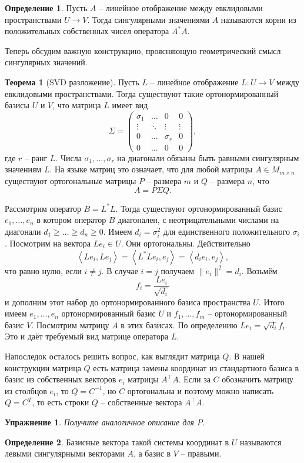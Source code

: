 \documentclass[12pt,a4paper,oneside]{book}
\newtheorem{uprz}{\color{violet!100!black} Упражнение}
\theoremstyle{definition}
\newtheorem*{defn}{\color{yellow!30!red} Определение}
\newtheorem{thm}{\color{red!40!black}Теорема}
\renewcommand{\geq}{\geqslant}
\def\lan{\left\langle }
\def\ran{\right\rangle}
\def\thrm{\begin{thm}}
\def\ethrm{\end{thm}}
\def\dfn{\begin{defn}}
\def\edfn{\end{defn}}
\def\pmat{\begin{pmatrix}}
\def\epmat{\end{pmatrix}}
\def\upr{\begin{uprz}}
\def\eupr{\end{uprz}}
\begin{document}
\dfn Пусть $A$ -- линейное отображение между евклидовыми пространствами $U \to V$. Тогда сингулярными значениями $A$ называются корни из положительных собственных чисел оператора $A^*A$.
\edfn



Теперь обсудим важную конструкцию, проясняющую геометрический смысл сингулярных значений.


\thrm[SVD разложение] Пусть $L$ -- линейное отображение $L\colon U \to V$ между евклидовыми пространствами. Тогда существуют такие ортонормированный базисы $U$ и $V$, что матрица $L$ имеет вид 
$$\Sigma=\pmat \sigma_1 &\dots& 0 & 0\\
 \vdots & \ddots &\vdots & \vdots\\
 0 & \dots & \sigma_r & 0\\
 0 &  \dots & 0 & 0 \epmat,$$
 где $r$ -- ранг $L$. Числа $\sigma_1, \dots, \sigma_r$ на диагонали обязаны быть равными сингулярным значениям $L$.
На языке матриц это означает, что для любой матрицы $A \in M_{m\times n}$ существуют ортогональные матрицы  $P$ -- размера $m$ и $Q$ -- размера $n$,  что
$$A= P \Sigma Q.$$
 
\proof Рассмотрим оператор $B = L^{*}L$. Тогда существуют ортонормированный базис $e_1,\dots,e_n$ в котором оператор $B$ диагонален, с неотрицательными числами на диагонали $d_1\geq\dots\geq d_n\geq 0$. Имеем  $d_i=\sigma_i^2$ для единственного положительного $\sigma_i$. 
Посмотрим на вектора $Le_i \in U$. Они ортогональны. Действительно
$$\lan Le_i, Le_j\ran = \lan L^{*}Le_i,e_j \ran = \lan d_i e_i,e_j\ran,$$
что равно нулю, если $i\neq j$. В случае $i=j$ получаем $\|e_i\|^2=d_i$. Возьмём 
$$f_i=\frac{Le_i}{\sqrt{d_i}}$$
и дополним этот набор до ортонормированного базиса пространства $U$. Итого имеем $e_1,\dots,e_n$ ортонормированный базис $U$ и $f_1,\dots,f_m$ -- ортонормированный базис $V$.
Посмотрим матрицу $A$ в этих базисах. По определению $Le_i=\sqrt{d_i}f_i$. Это и даёт требуемый вид матрице оператора $L$.


Напоследок осталось решить вопрос, как выглядит матрица $Q$. В нашей конструкции матрица $Q$ есть матрица замены координат из стандартного базиса в базис из собственных векторов $e_i$ матрицы $A^{\top}A$. Если за $C$ обозначить матрицу из столбцов $e_i$, то $Q=C^{-1}$, но $C$ ортогональна и поэтому можно написать $Q=C^{T}$, то есть строки $Q$ -- собственные вектора $A^{\top}A$.
\endproof
\ethrm

\upr Получите аналогичное описание для $P$.
\eupr

\dfn Базисные вектора такой системы координат в $U$ называются левыми сингулярными векторами $A$, а базис в $V$ -- правыми.  
\edfn
\end{document}
